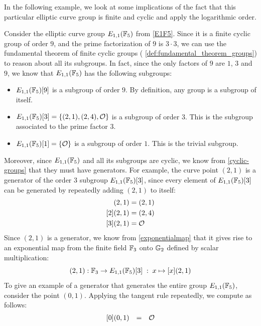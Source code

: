 In the following example, we look at some implications of the fact that this particular elliptic curve group is finite and cyclic and apply the logarithmic order.
\begin{example}\label{ex:G1G2-subgroups} Consider the elliptic curve group $E_{1,1}(\mathbb{F}_5)$ from \examplename{} \ref{E1F5}. Since it is a finite cyclic group of order $9$, and the prime factorization of $9$ is $3\cdot 3$, we can use the fundamental theorem of finite cyclic groups ( \ref{def:fundamental_theorem_groups}) to reason about all its subgroups. In fact, since the only  factors of $9$ are $1$, $3$ and $9$, we know that $E_{1,1}(\mathbb{F}_5)$ has the following subgroups:
\begin{itemize}
\item $E_{1,1}(\mathbb{F}_5)[9]$ is a subgroup of order $9$. By definition, any group is a subgroup of itself.
\item $E_{1,1}(\mathbb{F}_5)[3] = \{(2,1),(2,4),\mathcal{O}\}$ is a subgroup of order $3$. This is the subgroup associated to the prime factor $3$.
\item $E_{1,1}(\mathbb{F}_5)[1] = \{\mathcal{O}\}$ is a subgroup of order $1$. This is the trivial subgroup.
\end{itemize}
Moreover, since $E_{1,1}(\mathbb{F}_5)$ and all its subgroups are cyclic, we know from  \ref{cyclic-groups} that they must have generators. For example, the curve point $(2,1)$ is a generator of the order $3$ subgroup $E_{1,1}(\mathbb{F}_5)[3]$, since every element of $E_{1,1}(\mathbb{F}_5)[3]$ can be generated by repeatedly adding $(2,1)$ to itself: 
\begin{align*}
[1](2,1) & = (2,1) \\
[2](2,1) & = (2,4) \\
[3](2,1) & = \Oinf
\end{align*}
Since $(2,1)$ is a generator, we know from \eqref{exponentialmap} that it gives rise to an exponential map from the finite field $\mathbb{F}_3$ onto $\mathbb{G}_2$ defined by scalar multiplication:
\begin{equation}
[\cdot](2,1): \F_3 \to E_{1,1}(\F_5)[3]\; : \; x\mapsto [x](2,1) 
\end{equation}
To give an example of a generator that generates the entire group $E_{1,1}(\mathbb{F}_5)$, consider the point $(0,1)$. Applying the tangent rule repeatedly, we compute as follows:
\begin{equation}
\begin{array}{lccr}
{}\begin{array}{lcl}
{}[0](0,1) &=& \mathcal{O} \\

\end{array}
\end{array}
\end{equation}
\end{example}
